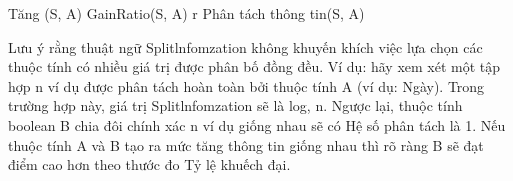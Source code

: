 Tăng (S, A) GainRatio(S, A) r Phân tách thông tin(S, A)

Lưu ý rằng thuật ngữ Splitlnfomzation không khuyến khích việc lựa chọn các thuộc tính có nhiều giá trị được phân bố đồng đều. Ví dụ: hãy xem xét một tập hợp n ví dụ được phân tách hoàn toàn bởi thuộc tính A (ví dụ: Ngày). Trong trường hợp này, giá trị Splitlnfomzation sẽ là log, n. Ngược lại, thuộc tính boolean B chia đôi chính xác n ví dụ giống nhau sẽ có Hệ số phân tách là 1. Nếu thuộc tính A và B tạo ra mức tăng thông tin giống nhau thì rõ ràng B sẽ đạt điểm cao hơn theo thước đo Tỷ lệ khuếch đại.

